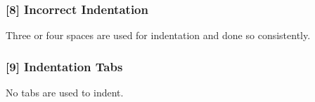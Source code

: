 \subsubsection{[8] Incorrect Indentation}
Three or four spaces are used for indentation and done so consistently.
\subsubsection{[9] Indentation Tabs}
No tabs are used to indent.